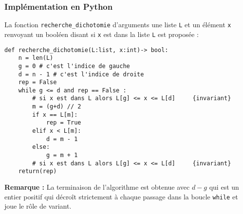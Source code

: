  

\subsubsection{Implémentation en Python}
La fonction \lstinline{recherche_dichotomie} d'arguments une liste \lstinline{L} et un élément \lstinline{x} renvoyant un booléen disant si \lstinline{x} est dans la liste \lstinline{L} est proposée :


\begin{lstlisting}
def recherche_dichotomie(L:list, x:int)-> bool:
    n = len(L)
    g = 0 # c'est l'indice de gauche
    d = n - 1 # c'est l'indice de droite
    rep = False
    while g <= d and rep == False :
        # si x est dans L alors L[g] <= x <= L[d]     {invariant}
        m = (g+d) // 2 
        if x == L[m]:
            rep = True
        elif x < L[m]:
            d = m - 1
        else:
            g = m + 1
        # si x est dans L alors L[g] <= x <= L[d]     {invariant}
    return(rep)
\end{lstlisting} 



\textbf{Remarque :} La terminaison de l'algorithme est obtenue avec $d-g$ qui est un entier positif qui décro\^{i}t strictement à chaque passage dans la boucle \lstinline{while} et joue le rôle de variant.

